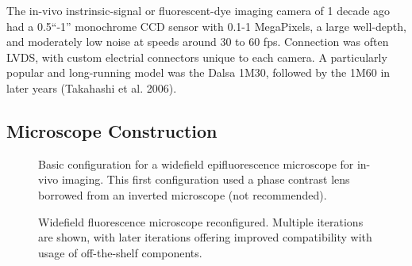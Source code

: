 \documentclass[
  12pt,
]{report}
\numberwithin{figure}{section}
\numberwithin{table}{section}
\numberwithin{equations}{section}
\begin{document}
The in-vivo instrinsic-signal or fluorescent-dye imaging camera of 1
decade ago had a 0.5``-1'' monochrome CCD sensor with 0.1-1 MegaPixels,
a large well-depth, and moderately low noise at speeds around 30 to 60
fps. Connection was often LVDS, with custom electrial connectors unique
to each camera. A particularly popular and long-running model was the
Dalsa 1M30, followed by the 1M60 in later years (Takahashi et al. 2006).

\hypertarget{microscope-construction}{%
\subsection{Microscope Construction}\label{microscope-construction}}

\begin{figure}
\centering


\caption{Basic configuration for a widefield epifluorescence microscope
for in-vivo imaging. This first configuration used a phase contrast lens
borrowed from an inverted microscope (not recommended).}

\label{fig:widefield-microscope1}

\end{figure}

\begin{figure}
\centering



\caption{Widefield fluorescence microscope reconfigured. Multiple
iterations are shown, with later iterations offering improved
compatibility with usage of off-the-shelf components.}

\label{fig:widefield-microscope3}

\end{figure}
\end{document}
